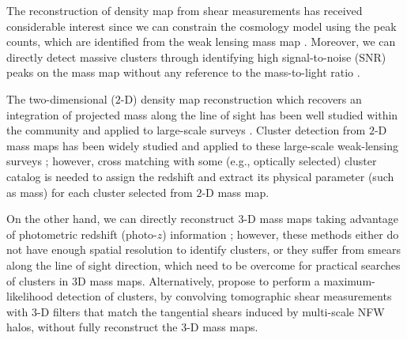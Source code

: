 \documentclass[twocolumn]{aastex63}
\begin{document}

The reconstruction of density map from shear measurements has received
considerable interest since
we can constrain the cosmology model using the peak counts, which are
identified from the weak lensing mass map
\citep{WL-massMap-peakcounts-Jain2000,WL-massMap-peakcountsAna-Fan2010,WL-massMap-peakcountsFM-Lin2016}.
Moreover, we can directly detect massive clusters through
identifying high signal-to-noise (SNR) peaks on the mass map without any
reference to the mass-to-light ratio
\citep{WL-massMap-clusDet-Schneider1996,WL-massMap-clusDet-Hamana2004}.

The two-dimensional ($2$-D) density map reconstruction which recovers an
integration of projected mass along the line of sight has been well studied
within the community
\citep{massMap-KS1993,WL-massMap-Glimpse2D-Lanusse2016,sparseBaysianMassMap-Price2020}
and applied to large-scale surveys
\citep{HSC1-massMaps,massMapDES-Chang2018,DES-SV-massMap-sparsity}.
Cluster detection from $2$-D mass maps has been widely studied and applied to
these large-scale weak-lensing surveys
\citep{WL-massMap-clusDet-CFHT-Shan2012,WL-massMap-clusDet-HSC-Miyazaki2018,WL-massMap-clusDet-HSC-Hamana2020};
however, cross matching with some (e.g., optically selected) cluster
catalog is needed to assign the redshift and extract its physical parameter
(such as mass) for each cluster selected from $2$-D mass map.

On the other hand, we can directly reconstruct $3$-D mass maps taking advantage
of photometric redshift (photo-$z$) information
\citep{LSS-massMap-Wiener-Simon2009,WL-massMap-VanderPlas2011}; however, these
methods either do not have enough spatial resolution to identify clusters, or
they suffer from smears along the line of sight direction, which need to be
overcome for practical searches of clusters in 3D mass maps.  Alternatively,
\citet{WL-clusDet-Hennawi2005} propose to perform a maximum-likelihood
detection of clusters, by convolving tomographic shear measurements with $3$-D
filters that match the tangential shears induced by multi-scale NFW halos,
without fully reconstruct the $3$-D mass maps.
\end{document}
